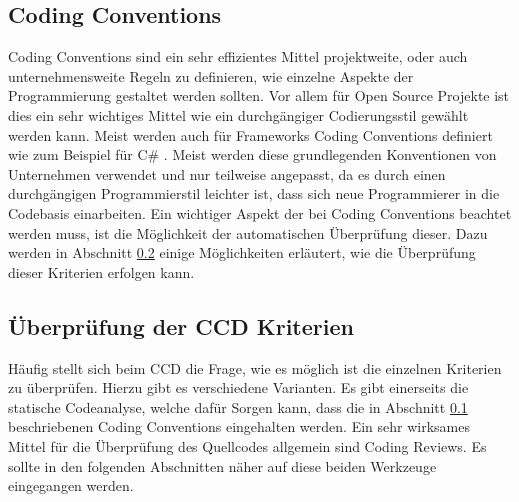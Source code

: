 \subsection{Coding Conventions}
\label{cha:CodingConventions}
Coding Conventions sind ein sehr effizientes Mittel projektweite, oder auch unternehmensweite Regeln zu definieren, wie einzelne Aspekte der Programmierung gestaltet werden sollten. Vor allem für Open Source Projekte ist dies ein sehr wichtiges Mittel wie ein durchgängiger Codierungsstil gewählt werden kann. Meist werden auch für Frameworks Coding Conventions definiert wie zum Beispiel für C\# \cite{Microsoft2016}. Meist werden diese grundlegenden Konventionen von Unternehmen verwendet und nur teilweise angepasst, da es durch einen durchgängigen Programmierstil leichter ist, dass sich neue Programmierer in die Codebasis einarbeiten. Ein wichtiger Aspekt der bei Coding Conventions beachtet werden muss, ist die Möglichkeit der automatischen Überprüfung dieser. Dazu werden in Abschnitt \ref{cha:CheckingCCDCriterias} einige Möglichkeiten erläutert, wie die Überprüfung dieser Kriterien erfolgen kann.

 
\subsection{Überprüfung der CCD Kriterien}
\label{cha:CheckingCCDCriterias}
Häufig stellt sich beim CCD die Frage, wie es möglich ist die einzelnen Kriterien zu überprüfen. Hierzu gibt es verschiedene Varianten. Es gibt einerseits die statische Codeanalyse, welche dafür Sorgen kann, dass die in Abschnitt \ref{cha:CodingConventions} beschriebenen Coding Conventions eingehalten werden. Ein sehr wirksames Mittel für die Überprüfung des Quellcodes allgemein sind Coding Reviews. Es sollte in den folgenden Abschnitten näher auf diese beiden Werkzeuge eingegangen werden.

